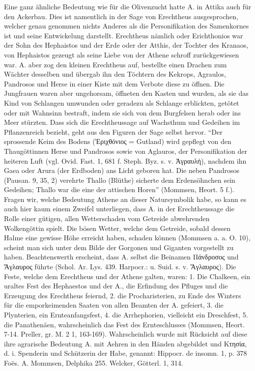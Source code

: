 \documentclass[a4paper, 11pt, oneside]{article}
\begin{document}
Eine ganz ähnliche Bedeutung wie für die Olivenzucht hatte A. in Attika auch für den Ackerbau. Dies ist namentlich in der Sage von Erechtheus ausgesprochen, welcher genau genommen nichts Anderes als die Personifikation des Samenkornes ist und seine Entwickelung darstellt. Erechtheus nämlich oder Erichthonios war der Sohn des Hephaistos und der Erde oder der Atthis, der Tochter des Kranaos, von Hephaistos gezeugt als seine Liebe von der Athene schroff zurückgewiesen war. A. aber zog den kleinen Erechtheus auf, bestellte einen Drachen zum Wächter desselben und übergab ihn den Töchtern des Kekrops, Agraulos, Pandrosos und Herse in einer Kiste mit dem Verbote diese zu öffnen. Die Jungfrauen waren aber ungehorsam, öffneten den Kasten und wurden, als sie das Kind von Schlangen umwunden oder geradezu als Schlange erblickten, getötet oder mit Wahnsinn bestraft, indem sie sich von dem Burgfelsen herab oder ins Meer stürzten. Dass sich die Erechtheussage auf Wachsthum und Gedeihen im Pflanzenreich bezieht, geht aus den Figuren der Sage selbst hervor. "`Der sprossende Keim des Bodens (Ἐριχθόνιος = Gutland) wird gepflegt von den Thaugöttinnen Herse und Pandrosos sowie von Aglauros, der Personifikation der heiteren Luft (vgl. Ovid. Fast. 1, 681 f. Steph. Byz. s. v. Ἀγραυλή), nachdem ihn Gaea oder Arura (der Erdboden) ans Licht geboren hat. Die neben Pandrosos (Pausan. 9, 35, 2) verehrte Thallo (Blüthe) sicherte dem Erdensöhnchen sein Gedeihen; Thallo war die eine der attischen Horen"' (Mommsen, Heort. 5 f.). Fragen wir, welche Bedeutung Athene an dieser Natursymbolik habe, so kann es auch hier kaum einem Zweifel unterliegen, dass A. in der Erechtheussage die Rolle einer gütigen, allen Wetterschaden vom Getreide abwehrenden Wolkengöttin spielt. Die bösen Wetter, welche dem Getreide, sobald dessen Halme eine gewisse Höhe erreicht haben, schaden können (Mommsen a. a. O. 10), scheint man sich unter dem Bilde der Gorgonen und Giganten vorgestellt zu haben. Beachtenswerth erscheint, dass A. selbst die Beinamen Πάνδροσος und Ἄγλαυρος führte (Schol. Ar. Lys. 439. Harpocr.: u. Suid. s. v. Ἄγλαυρος). Die Feste, welche dem Erechtheus und der Athene galten, waren: 1. Die Chalkeen, ein uraltes Fest des Hephaestos und der A., die Erfindung des Pfluges und die Erzeugung des Erechtheus feiernd, 2. die Procharisterien, zu Ende des Winters für die emporkeimenden Saaten von allen Beamten der A. gefeiert, 3. die Plynterien, ein Ernteanfangsfest, 4. die Arrhephorien, vielleicht ein Dreschfest, 5. die Panathenäen, wahrscheinlich das Fest des Ernteschlusses (Mommsen, Heort. 7-14. Preller, gr. M. 2 1, 163-169). Wahrscheinlich wurde mit Rücksicht auf diese ihre agrarische Bedeutung A. mit Aehren in den Händen abgebildet und Κτησία, d. i. Spenderin und Schützerin der Habe, genannt: Hippocr. de insomn. 1, p. 378 Foës. A. Mommsen, Delphika 255. Welcker, Götterl. 1, 314.
\end{document}
